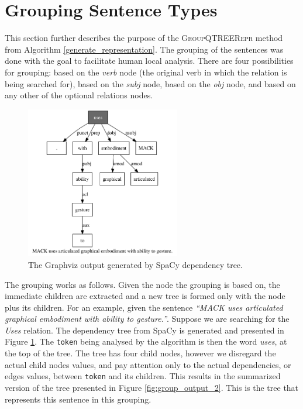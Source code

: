 \documentclass[11pt,a4paper,openright]{memoir}
\begin{document}
%
%
%
%

\section{Grouping Sentence Types}
\label{section:grouping}

This section further describes the purpose of the \textsc{GroupQTREERepr} method from Algorithm \ref{generate_representation}. The grouping of the sentences was done with the goal to facilitate human local analysis. There are four possibilities for grouping: based on the \emph{verb} node (the original verb in which the relation is being searched for), based on the \emph{subj} node, based on the \emph{obj} node, and based on any other of the optional relations nodes.

\begin{figure}[!htbp]
  \centering
    \includegraphics[width=0.6\textwidth]{./images/sentence-91-37}
  \caption[The Graphviz output generated by SpaCy dependency tree.]{The Graphviz output generated by SpaCy dependency tree.}
  \label{fig:tree_output}
\end{figure}

The grouping works as follows. Given the node the grouping is based on, the immediate children are extracted and a new tree is formed only with the node plus its children. For an example, given the sentence \emph{\enquote{MACK uses articulated graphical embodiment with ability to gesture.}}. Suppose we are searching for the \emph{Uses} relation. The dependency tree from SpaCy is generated and presented in Figure \ref{fig:tree_output}. The \texttt{token} being analysed by the algorithm is then the word \emph{uses}, at the top of the tree. The tree has four child nodes, however we disregard the actual child nodes values, and pay attention only to the actual dependencies, or edges values, between \texttt{token} and its children. This results in the summarized version of the tree presented in Figure \ref{fig:group_output_2}. This is the tree that represents this sentence in this grouping.
\end{document}
